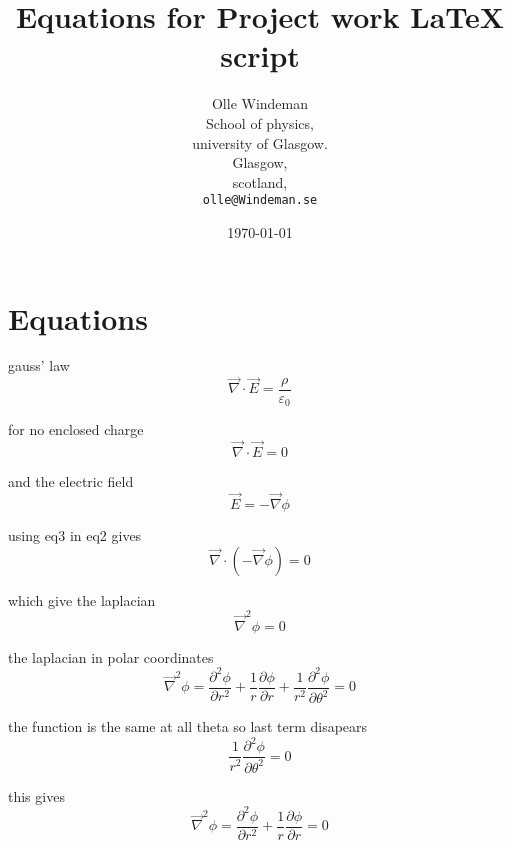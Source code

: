 \documentclass{article}
\begin{document}
\title{ Equations for Project work \LaTeX{} script }
\author{Olle Windeman\\
  School of physics,\\
  university of Glasgow.\\
  Glasgow,\\
  scotland,\\
  \texttt{olle@Windeman.se}}
\date{\today}
\maketitle



\section{Equations}
gauss' law
\begin{equation}
\vec{\nabla} \cdot \vec{E} = \frac{\rho}{\varepsilon_{0}}
\label{1}
\end{equation}

for no enclosed charge
\begin{equation}
\vec{\nabla} \cdot \vec{E} = 0
\label{2}
\end{equation}

and the electric field
\begin{equation}
\vec{E} = -\vec{\nabla}\phi
\label{3}
\end{equation}

using eq3 in eq2 gives
\begin{equation}
\vec{\nabla} \cdot (-\vec{\nabla}\phi) = 0
\label{4}
\end{equation}

which give the laplacian
\begin{equation}
\vec{\nabla}^2\phi = 0
\label{5}
\end{equation}

the laplacian in polar coordinates
\begin{equation}
\vec{\nabla}^2\phi = \frac{\partial^2\phi}{\partial r^2}+\frac{1}{r}\frac{\partial\phi}{\partial r}+\frac{1}{r^2} \frac{\partial^2\phi}{\partial\theta^2}=0
\label{6}
\end{equation}

the function is the same at all theta so last term disapears
\begin{equation}
\frac{1}{r^2} \frac{\partial^2\phi}{\partial\theta^2}=0
\label{7}
\end{equation}

this gives
\begin{equation}
\vec{\nabla}^2\phi = \frac{\partial^2\phi}{\partial r^2}+\frac{1}{r}\frac{\partial\phi}{\partial r}=0
\label{8}
\end{equation}
\end{document}
